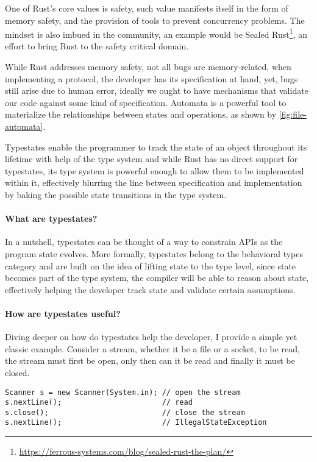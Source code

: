 \documentclass{article}
\begin{document}
One of Rust's core values is safety,
such value manifests itself in the form of memory safety,
and the provision of tools to prevent concurrency problems.
The mindset is also imbued in the community,
an example would be Sealed Rust\footnote{\url{https://ferrous-systems.com/blog/sealed-rust-the-plan/}},
an effort to bring Rust to the safety critical domain.

While Rust addresses memory safety, not all bugs are memory-related,
when implementing a protocol, the developer has its specification at hand, yet, bugs still arise due to human error,
ideally we ought to have mechanisms that validate our code against some kind of specification.
Automata is a powerful tool to materialize the relationships between states and operations,
as shown by \autoref{fig:file-automata}.

Typestates enable the programmer to track the state of an object throughout its lifetime with help of the type system
and while Rust has no direct support for typestates,
its type system is powerful enough to allow them to be implemented within it,
effectively blurring the line between specification and implementation by baking the possible state transitions in the type system.



\paragraph{What are typestates?}

In a nutshell, typestates can be thought of a way to constrain APIs as the program state evolves.
More formally, typestates belong to the behavioral types category and are built on the idea of lifting state to the type level,
since state becomes part of the type system, the compiler will be able to reason about state,
effectively helping the developer track state and validate certain assumptions.

\paragraph{How are typestates useful?}

Diving deeper on how do typestates help the developer, I provide a simple yet classic example.
Consider a stream, whether it be a file or a socket, to be read, the stream must first be open,
only then can it be read and finally it must be closed.

\begin{verbatim}
Scanner s = new Scanner(System.in); // open the stream
s.nextLine();                       // read
s.close();                          // close the stream
s.nextLine();                       // IllegalStateException
\end{verbatim}
\end{document}
